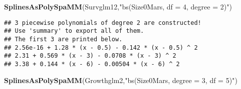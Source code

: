 \documentclass[
]{article}
\newenvironment{Shaded}{\begin{snugshade}}{\end{snugshade}}
\newcommand{\AttributeTok}[1]{\textcolor[rgb]{0.13,0.29,0.53}{#1}}
\newcommand{\CommentTok}[1]{\textcolor[rgb]{0.56,0.35,0.01}{\textit{#1}}}
\newcommand{\ControlFlowTok}[1]{\textcolor[rgb]{0.13,0.29,0.53}{\textbf{#1}}}
\newcommand{\DecValTok}[1]{\textcolor[rgb]{0.00,0.00,0.81}{#1}}
\newcommand{\FunctionTok}[1]{\textcolor[rgb]{0.13,0.29,0.53}{\textbf{#1}}}
\newcommand{\NormalTok}[1]{#1}
\newcommand{\OtherTok}[1]{\textcolor[rgb]{0.56,0.35,0.01}{#1}}
\newcommand{\SpecialCharTok}[1]{\textcolor[rgb]{0.81,0.36,0.00}{\textbf{#1}}}
\newcommand{\StringTok}[1]{\textcolor[rgb]{0.31,0.60,0.02}{#1}}
\begin{document}
\begin{Shaded}
\end{Shaded}

\begin{Shaded}
\begin{Highlighting}[]
\FunctionTok{SplinesAsPolySpaMM}\NormalTok{(Survglm12,}\StringTok{"bs(Size0Mars, df = 4, degree = 2)"}\NormalTok{)}
\end{Highlighting}
\end{Shaded}

\begin{verbatim}
## 3 piecewise polynomials of degree 2 are constructed!
## Use 'summary' to export all of them.
## The first 3 are printed below.
## 2.56e-16 + 1.28 * (x - 0.5) - 0.142 * (x - 0.5) ^ 2
## 2.31 + 0.569 * (x - 3) - 0.0708 * (x - 3) ^ 2
## 3.38 + 0.144 * (x - 6) - 0.00504 * (x - 6) ^ 2
\end{verbatim}

\begin{Shaded}
\begin{Highlighting}[]
\FunctionTok{SplinesAsPolySpaMM}\NormalTok{(Growthglm2,}\StringTok{"bs(Size0Mars, degree = 3, df = 5)"}\NormalTok{)}
\end{Highlighting}
\end{Shaded}
\end{document}
